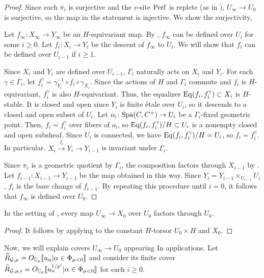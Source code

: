 \documentclass[12pt,reqno]{amsart}
\begin{document}
\begin{proof}
    Since each $\pi_i$ is surjective and the $v$-site ${\operatorname{Perf}}$ is replete (as in \cite[Lemma 2.6]{Heu21}), $U_\infty \to U_0$ is surjective, so the map in the statement is injective. We show the surjectivity, 

    Let $f_\infty\colon X_\infty \to Y_\infty$ be an $H$-equivariant map. By \cite[Lemma 12.17]{Sch17}, $f_\infty$ can be defined over $U_i$ for some $i\geq 0$. Let $f_i\colon X_i \to Y_i$ be the descent of $f_\infty$ to $U_i$. We will show that $f_i$ can be defined over $U_{i-1}$ if $i \geq 1$. 

    Since $X_i$ and $Y_i$ are defined over $U_{i-1}$, $\Gamma_i$ naturally acts on $X_i$ and $Y_i$. For each $\gamma \in \Gamma_i$, let $f_i^\gamma = \gamma_{Y_i}^{-1} \circ f_i \circ \gamma_{X_i}$. Since the actions of $H$ and $\Gamma_i$ commute and $f_i$ is $H$-equivariant, $f_i^\gamma$ is also $H$-equivariant. Thus, the equalizer ${\operatorname{Eq}}(f_i, f_i^\gamma)\subset X_i$ is $H$-stable. It is closed and open since $Y_i$ is finite \'{e}tale over $U_i$, so it descends to a closed and open subset of $U_i$. Let $o_i\colon {\operatorname{Spa}}(C,C^+) \to U_i$ be a $\Gamma_i$-fixed geometric point. Then, $f_i = f_i^\gamma$ over fibers of $o_i$, so ${\operatorname{Eq}}(f_i, f_i^\gamma)/H \subset U_i$ is a nonempty closed and open subsheaf. Since $U_i$ is connected, we have ${\operatorname{Eq}}(f_i, f_i^\gamma)/H = U_i$, so $f_i = f_i^\gamma$. In particular, $X_i \xrightarrow{f_i} Y_i \to Y_{i-1}$ is invariant under $\Gamma_i$. 
    
    Since $\pi_i$ is a geometric quotient by $\Gamma_i$, the composition factors through $X_{i-1}$ by \cite[Proposition 3.10]{Tak26_rel}. Let $f_{i-1}\colon X_{i-1} \to Y_{i-1}$ be the map obtained in this way. Since $Y_i = Y_{i-1} \times_{U_{i-1}} U_i$, $f_i$ is the base change of $f_{i-1}$. By repeating this procedure until $i=0$, it follows that $f_\infty$ is defined over $U_0$. 
\end{proof}

\begin{cor} \label{cor:trivatinf}
    In the setting of , every map $U_\infty \to X_0$ over $U_0$ factors through $U_0$. 
\end{cor}
\begin{proof}
    It follows by applying  to the constant $H$-torsor $U_0\times H$ and $X_0$. 
\end{proof}

Now, we will explain covers $U_\infty \to U_0$ appearing In applications. Let ${\widetilde{R}}_{{\mathcal{G}}, \mu} = O_{\mathbb{C}_p}\llbracket u_\alpha \vert \alpha \in \Phi_{\mu < 0} \rrbracket$ and consider its finite cover
$
    {\widetilde{R}}_{{\mathcal{G}}, \mu, i} = O_{\mathbb{C}_p}\llbracket u_\alpha^{1 / p^i} \vert \alpha \in \Phi_{\mu < 0} \rrbracket
$ for each $i \geq 0$. 
\end{document}
